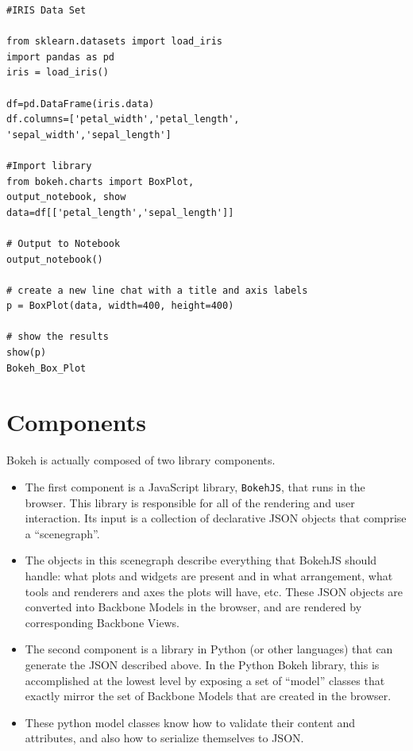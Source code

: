 \documentclass[12pt, a4paper]{report}
\begin{document}
\begin{verbatim}
#IRIS Data Set

from sklearn.datasets import load_iris
import pandas as pd
iris = load_iris()

df=pd.DataFrame(iris.data)
df.columns=['petal_width','petal_length',
'sepal_width','sepal_length']

#Import library
from bokeh.charts import BoxPlot,   
output_notebook, show
data=df[['petal_length','sepal_length']]

# Output to Notebook
output_notebook()

# create a new line chat with a title and axis labels
p = BoxPlot(data, width=400, height=400)

# show the results
show(p)
Bokeh_Box_Plot
\end{verbatim}

\newpage
\section*{Components}
\Large

Bokeh is actually composed of two library components.

\begin{itemize}
	\item The first component is a JavaScript library, \texttt{BokehJS}, that runs in the browser. This library is responsible for all of the rendering and user interaction. Its input is a collection of declarative JSON objects that comprise a “scenegraph”. 
	\item The objects in this scenegraph describe everything that BokehJS should handle: what plots and widgets are present and in what arrangement, what tools and renderers and axes the plots will have, etc. These JSON objects are converted into Backbone Models in the browser, and are rendered by corresponding Backbone Views.
	
	\item The second component is a library in Python (or other languages) that can generate the JSON described above. In the Python Bokeh library, this is accomplished at the lowest level by exposing a set of “model” classes that exactly mirror the set of Backbone Models that are created in the browser. 
	\item These python model classes know how to validate their content and attributes, and also how to serialize themselves to JSON. 
	
\end{itemize}
\newpage
\end{document}
